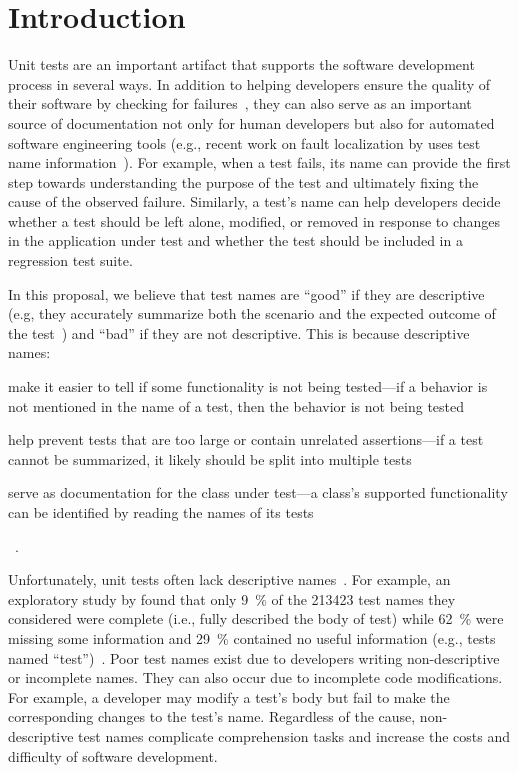 \section{Introduction}
\label{sec:introduction}

Unit tests are an important artifact that supports the software development process in several ways.
%
In addition to helping developers ensure the quality of their software by checking for failures~\cite{daka2014survey}, they can also serve as an important source of documentation not only for human developers but also for automated software engineering tools (e.g., recent work on fault localization by \citeauthor{li2019deepfl} uses test name information~\cite{li2019deepfl}).
%
For example, when a test fails, its name can provide the first step towards understanding the purpose of the test and ultimately fixing the cause of the observed failure.
%
Similarly, a test's name can help developers decide whether a test should be left alone, modified, or removed in response to changes in the application under test and whether the test should be included in a regression test suite.


In this proposal, we believe that test names are \enquote{good} if they are descriptive (e.g, they accurately summarize both the scenario and the expected outcome of the test~\cite{trenk14}) and \enquote{bad} if they are not descriptive.
%
This is because descriptive names:
\begin{enumerate*}
\item make it easier to tell if some functionality is not being tested---if a behavior is not mentioned in the name of a test, then the behavior is not being tested
\item help prevent tests that are too large or contain unrelated assertions---if a test cannot be summarized, it likely should be split into multiple tests
\item serve as documentation for the class under test---a class's supported functionality can be identified by reading the names of its tests
\end{enumerate*}~\cite{zhang2015automatically}.


Unfortunately, unit tests often lack descriptive names~\cite{zhang2015automatically, daka2017generating}.
%
For example, an exploratory study by \citeauthor{zhang2015automatically} found that only \SI{9}{\percent} of the \num{213423} test names they considered were complete (i.e., fully described the body of test) while \SI{62}{\percent} were missing some information and \SI{29}{\percent} contained no useful information (e.g., tests named \enquote{test})~\cite{zhang2015automatically}.
%
Poor test names exist due to developers writing non-descriptive or incomplete names.
%
They can also occur due to incomplete code modifications.
%
For example, a developer may modify a test's body but fail to make the corresponding changes to the test's name.
%
Regardless of the cause, non-descriptive test names complicate comprehension tasks and increase the costs and difficulty of software development.


